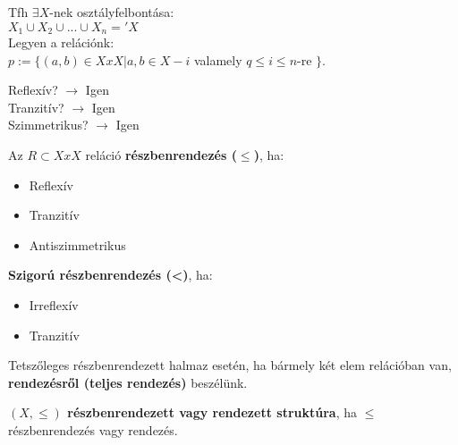 \documentclass{beamer}
\newcommand{\mmedskip}{\vspace{0.5em}}
\begin{document}
\begin{frame}
\begin{tcolorbox}[title={Tétel: Ekvivalenciareláció és osztályfelbontás kapcsolata}]
Tfh ${\exists}X$-nek osztályfelbontása:\\

$X_1 \cup X_2 \cup ... \cup X_n =  'X$\\

Legyen a relációnk:\\

$p := \{(a,b) \in X x X | a, b \in X-i$ valamely $q \leq i \leq n$-re $\}$.\\
\mmedskip

Reflexív? $\rightarrow$ Igen\\
Tranzitív? $\rightarrow$ Igen\\
Szimmetrikus? $\rightarrow$ Igen
\end{tcolorbox}
\end{frame}


\begin{frame}
\begin{tcolorbox}[title={Def.: Részbenrendezés, Szigorú részbenrendezés}]
Az $R \subset X x X$ reláció \textbf{részbenrendezés (${\leq}$)}, ha:\\
\begin{itemize}
\item Reflexív
\item Tranzitív
\item Antiszimmetrikus
\end{itemize}
\mmedskip

\textbf{Szigorú részbenrendezés (<)}, ha:\\
\begin{itemize}
\item Irreflexív
\item Tranzitív
\end{itemize}
\end{tcolorbox}

\begin{tcolorbox}[title={Def.: Teljes rendezés}]
Tetszőleges részbenrendezett halmaz esetén, ha bármely két elem relációban van, \textbf{rendezésről (teljes rendezés)} beszélünk.
\end{tcolorbox}

\begin{tcolorbox}[title={Def.: Részbenrendezett, vagy rendezett struktúra}]
\textbf{$(X, {\leq})$ részbenrendezett vagy rendezett struktúra}, ha ${\leq}$ részbenrendezés vagy rendezés.
\end{tcolorbox}

\begin{tcolorbox}[title={Def.: Diagonális reláció}]
\end{tcolorbox}


\end{frame}
\end{document}
